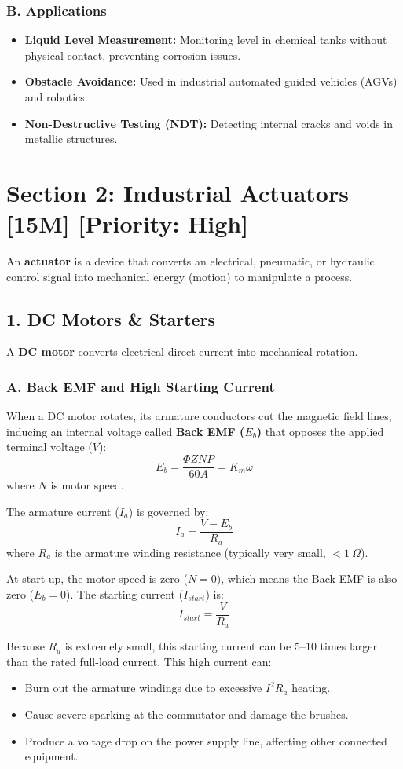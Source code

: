 \subsubsection{B. Applications}
\begin{itemize}
  \item \textbf{Liquid Level Measurement:} Monitoring level in chemical tanks without physical contact, preventing corrosion issues.
  \item \textbf{Obstacle Avoidance:} Used in industrial automated guided vehicles (AGVs) and robotics.
  \item \textbf{Non-Destructive Testing (NDT):} Detecting internal cracks and voids in metallic structures.
\end{itemize}


\section{Section 2: Industrial Actuators [15M] [Priority: High]}

An \textbf{actuator} is a device that converts an electrical, pneumatic, or hydraulic control signal into mechanical energy (motion) to manipulate a process.


\subsection{1. DC Motors \& Starters}
A \textbf{DC motor} converts electrical direct current into mechanical rotation.

\subsubsection{A. Back EMF and High Starting Current}
When a DC motor rotates, its armature conductors cut the magnetic field lines, inducing an internal voltage called \textbf{Back EMF ($E_b$)} that opposes the applied terminal voltage ($V$):
\[ E_b = \frac{\Phi Z N P}{60 A} = K_m \omega \]
where $N$ is motor speed.

The armature current ($I_a$) is governed by:
\[ I_a = \frac{V - E_b}{R_a} \]
where $R_a$ is the armature winding resistance (typically very small, $< 1\ \Omega$).

At start-up, the motor speed is zero ($N = 0$), which means the Back EMF is also zero ($E_b = 0$). The starting current ($I_{start}$) is:
\[ I_{start} = \frac{V}{R_a} \]

Because $R_a$ is extremely small, this starting current can be $5\text{--}10$ times larger than the rated full-load current. This high current can:
\begin{itemize}
  \item Burn out the armature windings due to excessive $I^2 R_a$ heating.
  \item Cause severe sparking at the commutator and damage the brushes.
  \item Produce a voltage drop on the power supply line, affecting other connected equipment.
\end{itemize}

